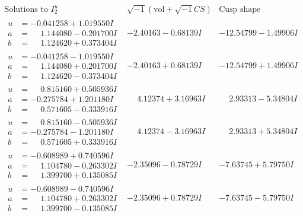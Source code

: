 \documentclass[1p]{elsarticle_modified}
\theoremstyle{definition}
\newcommand{\I}{\sqrt{-1}}
\begin{document}
$$\begin{array}{c|c|c}  
\text{Solutions to }I^u_{2}& \I (\text{vol} + \sqrt{-1}CS) & \text{Cusp shape}\\
 \hline 
\begin{aligned}
u &= -0.041258 + 1.019550 I \\
a &= \phantom{-}1.144080 - 0.201700 I \\
b &= \phantom{-}1.124620 + 0.373404 I\end{aligned}
 & -2.40163 - 0.68139 I & -12.54799 - 1.49906 I \\ \hline\begin{aligned}
u &= -0.041258 - 1.019550 I \\
a &= \phantom{-}1.144080 + 0.201700 I \\
b &= \phantom{-}1.124620 - 0.373404 I\end{aligned}
 & -2.40163 + 0.68139 I & -12.54799 + 1.49906 I \\ \hline\begin{aligned}
u &= \phantom{-}0.815160 + 0.505936 I \\
a &= -0.275784 + 1.201180 I \\
b &= \phantom{-}0.571605 - 0.333916 I\end{aligned}
 & \phantom{-}4.12374 + 3.16963 I & \phantom{-}2.93313 - 5.34804 I \\ \hline\begin{aligned}
u &= \phantom{-}0.815160 - 0.505936 I \\
a &= -0.275784 - 1.201180 I \\
b &= \phantom{-}0.571605 + 0.333916 I\end{aligned}
 & \phantom{-}4.12374 - 3.16963 I & \phantom{-}2.93313 + 5.34804 I \\ \hline\begin{aligned}
u &= -0.608989 + 0.740596 I \\
a &= \phantom{-}1.104780 - 0.263302 I \\
b &= \phantom{-}1.399700 + 0.135085 I\end{aligned}
 & -2.35096 - 0.78729 I & -7.63745 + 5.79750 I \\ \hline\begin{aligned}
u &= -0.608989 - 0.740596 I \\
a &= \phantom{-}1.104780 + 0.263302 I \\
b &= \phantom{-}1.399700 - 0.135085 I\end{aligned}
 & -2.35096 + 0.78729 I & -7.63745 - 5.79750 I \\ \hline\begin{aligned}

\end{aligned}
\end{array}$$
\end{document}
